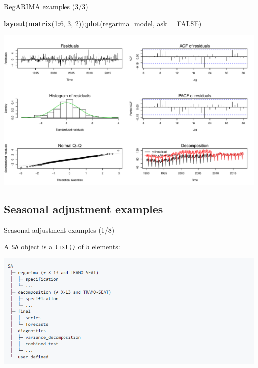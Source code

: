 \documentclass[10pt,xcolor=table,color={dvipsnames,usenames},ignorenonframetext,usepdftitle=false,french]{beamer}
\newenvironment{Shaded}{\begin{snugshade}}{\end{snugshade}}
\newcommand{\DataTypeTok}[1]{\textcolor[rgb]{0.13,0.29,0.53}{#1}}
\newcommand{\DecValTok}[1]{\textcolor[rgb]{0.00,0.00,0.81}{#1}}
\newcommand{\KeywordTok}[1]{\textcolor[rgb]{0.13,0.29,0.53}{\textbf{#1}}}
\newcommand{\NormalTok}[1]{#1}
\newcommand{\OperatorTok}[1]{\textcolor[rgb]{0.81,0.36,0.00}{\textbf{#1}}}
\newcommand{\OtherTok}[1]{\textcolor[rgb]{0.56,0.35,0.01}{#1}}
\begin{document}
\begin{frame}[fragile]{RegARIMA examples (3/3)}
\protect\hypertarget{regarima-examples-33}{}

\begin{Shaded}
\begin{Highlighting}[]
\KeywordTok{layout}\NormalTok{(}\KeywordTok{matrix}\NormalTok{(}\DecValTok{1}\OperatorTok{:}\DecValTok{6}\NormalTok{, }\DecValTok{3}\NormalTok{, }\DecValTok{2}\NormalTok{));}\KeywordTok{plot}\NormalTok{(regarima_model, }\DataTypeTok{ask =} \OtherTok{FALSE}\NormalTok{)}
\end{Highlighting}
\end{Shaded}

\includegraphics{img/markdown-unnamed-chunk-5-1.pdf}

\end{frame}

\hypertarget{seasonal-adjustment-examples}{%
\subsection{Seasonal adjustment
examples}\label{seasonal-adjustment-examples}}

\begin{frame}[fragile]{Seasonal adjustment examples (1/8)}
\protect\hypertarget{seasonal-adjustment-examples-18}{}

A \texttt{SA} object is a \texttt{list()} of 5 elements:

\includegraphics{img/sa_obj_struct.png}

\end{frame}
\end{document}
